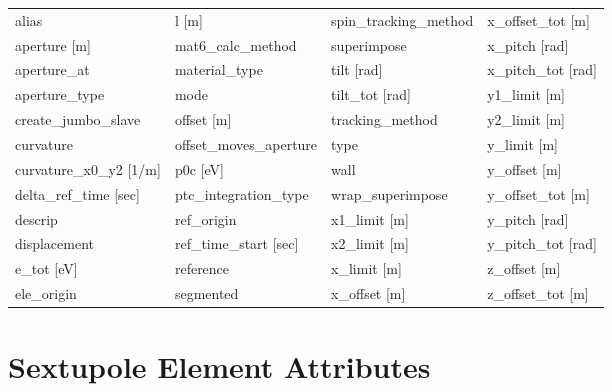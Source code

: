  \begin{tabular}{llll} \toprule
alias                            & l [m]                            & spin_tracking_method             & x_offset_tot [m]                 \\
aperture [m]                     & mat6_calc_method                 & superimpose                      & x_pitch [rad]                    \\
aperture_at                      & material_type                    & tilt [rad]                       & x_pitch_tot [rad]                \\
aperture_type                    & mode                             & tilt_tot [rad]                   & y1_limit [m]                     \\
create_jumbo_slave               & offset [m]                       & tracking_method                  & y2_limit [m]                     \\
curvature                        & offset_moves_aperture            & type                             & y_limit [m]                      \\
curvature_x0_y2 [1/m]            & p0c [eV]                         & wall                             & y_offset [m]                     \\
delta_ref_time [sec]             & ptc_integration_type             & wrap_superimpose                 & y_offset_tot [m]                 \\
descrip                          & ref_origin                       & x1_limit [m]                     & y_pitch [rad]                    \\
displacement                     & ref_time_start [sec]             & x2_limit [m]                     & y_pitch_tot [rad]                \\
e_tot [eV]                       & reference                        & x_limit [m]                      & z_offset [m]                     \\
ele_origin                       & segmented                        & x_offset [m]                     & z_offset_tot [m]                 \\
 \bottomrule
 \end{tabular}
 \vfill
 
 \section{Sextupole Element Attributes}
 \label{s:list.sextupole}
 
